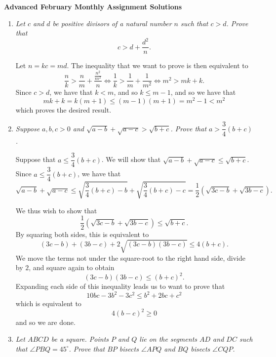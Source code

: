 \documentclass{article}
\begin{document}
\thispagestyle{empty}

\begin{center}
  \textbf{\Large Advanced February Monthly Assignment Solutions}
\end{center}

\vspace{12pt}

\begin{enumerate}[1.]

\vspace{24pt}
\item %
{\itshape Let $c$ and $d$ be positive divisors of a natural number $n$ such that $c > d$. Prove that $$c > d + \frac{d^2}{n}.$$}

Let $n = kc = md$. The inequality that we want to prove is then equivalent to
\[
	\frac{n}{k} > \frac{n}{m} + \frac{\frac{n^2}{m^2}}{n} \iff \frac{1}{k} > \frac{1}{m} + \frac{1}{m^2} \iff m^2 > mk + k.
\]
Since $c > d$, we have that $k < m$, and so $k \leq m - 1$, and so we have that
\[
	mk + k = k(m + 1) \leq (m - 1)(m + 1) = m^2 - 1 < m^2
\]
which proves the desired result.


\vspace{24pt}
\item %
{\itshape Suppose $a,b,c > 0$ and $\sqrt{a-b} +\sqrt{a-c} > \sqrt{b+c}$. Prove that $a > \dfrac{3}{4} (b+c)$.}

Suppose that $a \leq \dfrac{3}{4} (b + c)$. We will show that $\sqrt{a-b} +\sqrt{a-c} \leq \sqrt{b+c}$. Since $a \leq \dfrac{3}{4} (b + c)$, we have that
\[
	\sqrt{a-b} +\sqrt{a-c} \leq \sqrt{\frac{3}{4}(b + c) - b} + \sqrt{\frac{3}{4}(b + c) - c} = \frac{1}{2} \left(\sqrt{3c - b} + \sqrt{3b - c}\right).
\]

We thus wish to show that
\[
	\dfrac{1}{2} \left(\sqrt{3c - b} + \sqrt{3b - c}\right)  \leq \sqrt{b + c}.
\]
By squaring both sides, this is equivalent to
\[
	(3c - b) + (3b - c) + 2\sqrt{(3c - b)(3b - c)}  \leq 4(b + c).
\]
We move the terms not under the square-root to the right hand side, divide by $2$, and square again to obtain
\[
	(3c - b)(3b - c) \leq (b + c)^2.
\]
Expanding each side of this inequality leads us to want to prove that
\[
	10bc - 3b^2 - 3c^2 \leq b^2 + 2bc + c^2
\]
which is equivalent to
\[
	4(b - c)^2 \geq 0
\]
and so we are done.


\vspace{24pt}
\item %
{\itshape Let $ABCD$ be a square.
Points $P$ and $Q$ lie on the segments $AD$ and $DC$ such that $\angle PBQ = 45^\circ$.
Prove that $BP$ bisects $\angle APQ$ and $BQ$ bisects $\angle CQP$.}


\end{enumerate}
\end{document}
